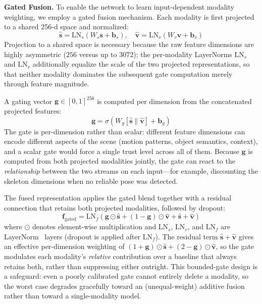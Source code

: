 \textbf{Gated Fusion.} To enable the network to learn input-dependent modality weighting, we
employ a gated fusion mechanism. Each modality is first projected to a shared 256-d space and
normalized:
\begin{equation}
    \hat{\mathbf{s}} = \text{LN}_s(W_s \mathbf{s} + \mathbf{b}_s), \quad \hat{\mathbf{v}} = \text{LN}_v(W_v \mathbf{v} + \mathbf{b}_v)
\end{equation}
Projection to a shared space is necessary because the raw feature dimensions are highly
asymmetric ($256$ versus up to $3072$); the per-modality LayerNorms $\text{LN}_s$ and
$\text{LN}_v$ additionally equalize the scale of the two projected representations, so that
neither modality dominates the subsequent gate computation merely through feature magnitude.

A gating vector $\mathbf{g} \in [0, 1]^{256}$ is computed per dimension from the concatenated
projected features:
\begin{equation}
    \mathbf{g} = \sigma\left( W_g \left[ \hat{\mathbf{s}} \| \hat{\mathbf{v}} \right] + \mathbf{b}_g \right)
\end{equation}
The gate is per-dimension rather than scalar: different feature dimensions can encode different
aspects of the scene (motion patterns, object semantics, context), and a scalar gate would force
a single trust level across all of them. Because $\mathbf{g}$ is computed from both projected
modalities jointly, the gate can react to the \emph{relationship} between the two streams on each
input---for example, discounting the skeleton dimensions when no reliable pose was detected.

The fused representation applies the gated blend together with a residual connection that retains
both projected modalities, followed by dropout:
\begin{equation}
    \mathbf{f}_{\text{gated}} = \text{LN}_f\left( \mathbf{g} \odot \hat{\mathbf{s}} + (1 - \mathbf{g}) \odot \hat{\mathbf{v}} + \hat{\mathbf{s}} + \hat{\mathbf{v}} \right)
\end{equation}
where $\odot$ denotes element-wise multiplication and $\text{LN}_s$, $\text{LN}_v$, and
$\text{LN}_f$ are LayerNorm~\cite{ba2016layernorm} layers (dropout is applied after
$\text{LN}_f$). The residual term $\hat{\mathbf{s}} + \hat{\mathbf{v}}$ gives an effective
per-dimension weighting of $(1 + \mathbf{g}) \odot \hat{\mathbf{s}} + (2 - \mathbf{g}) \odot
\hat{\mathbf{v}}$, so the gate modulates each modality's \emph{relative} contribution over a
baseline that always retains both, rather than suppressing either outright. This bounded-gate
design is a safeguard: even a poorly calibrated gate cannot entirely delete a modality, so the
worst case degrades gracefully toward an (unequal-weight) additive fusion rather than toward a
single-modality model.

